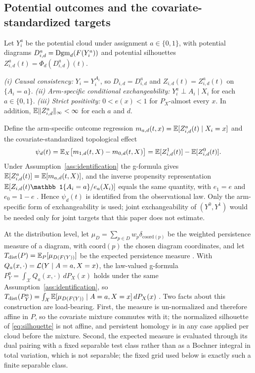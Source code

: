 \subsection{Potential outcomes and the covariate-standardized targets}

Let $Y_i^a$ be the potential cloud under assignment $a \in \{0,1\}$, with potential diagrams
$D_{i,d}^a = \mathrm{Dgm}_d(F(Y_i^a))$ and potential silhouettes $Z_{i,d}^a(t) = \Phi_d(D_{i,d}^a)(t)$.

\begin{assumption}[Identification]
\label{ass:identification}
\emph{(i) Causal consistency:} $Y_i = Y_i^{A_i}$, so
$D_{i,d} = D_{i,d}^a$ and $Z_{i,d}(t) = Z_{i,d}^a(t)$ on $\{A_i=a\}$. \emph{(ii) Arm-specific
conditional exchangeability:} $Y_i^a \perp A_i \mid X_i$ for each $a \in \{0,1\}$. \emph{(iii)
Strict positivity:} $0 < e(x) < 1$ for $P_X$-almost every $x$. In addition,
$\mathbb{E}\lVert Z_{i,d}^a\rVert_\infty < \infty$ for each $a$ and $d$.
\end{assumption}

Define the arm-specific outcome regression $m_{a,d}(t,x) = \mathbb{E}[Z_{i,d}^a(t) \mid X_i = x]$ and the
covariate-standardized topological effect
\begin{equation}
\label{eq:psi}
\psi_d(t) = \mathbb{E}_X\bigl[m_{1,d}(t,X) - m_{0,d}(t,X)\bigr]
= \mathbb{E}[Z_{i,d}^1(t)] - \mathbb{E}[Z_{i,d}^0(t)].
\end{equation}
Under Assumption~\ref{ass:identification} the g-formula gives $\mathbb{E}[Z_{i,d}^a(t)] = \mathbb{E}[m_{a,d}(t,X)]$, and the inverse
propensity representation $\E[Z_{i,d}(t)\mathbb 1\{A_i=a\}/e_a(X_i)]$ equals the same quantity,
with $e_1=e$ and $e_0=1-e$ \cite{souto_diamantis_tcda_2026,kim_lee_tce_2026}. Hence $\psi_d(t)$ is
identified from the observational law. Only the arm-specific form of exchangeability is used;
joint exchangeability of $(Y^0,Y^1)$ would be needed only for joint targets that this paper does
not estimate.

At the distribution level, let $\mu_D = \sum_{p \in D} w_p \delta_{\mathrm{coord}(p)}$ be the
weighted persistence measure of a diagram, with $\mathrm{coord}(p)$ the chosen diagram
coordinates, and let $T_{\mathrm{dist}}(P) = \mathbb{E}_P[\mu_{D(F(Y))}]$ be the expected persistence
measure \cite{divol_chazal_2020,divol_lacombe_2021}. With $Q_a(x,\cdot) = \mathcal{L}(Y \mid A=a, X=x)$,
the law-valued g-formula $P^a_Y = \int_{\mathcal X} Q_a(x,\cdot)\,dP_X(x)$ holds under the same
Assumption~\ref{ass:identification}, so $T_{\mathrm{dist}}(P^a_Y) = \int_{\mathcal X}
\mathbb{E}[\mu_{D(F(Y))} \mid A=a, X=x]\,dP_X(x)$ \cite{souto_diamantis_tcda_2026}. Two facts about this
construction are load-bearing. First, the measure is un-normalized and therefore affine in $P$,
so the covariate mixture commutes with it; the normalized silhouette of \eqref{eq:silhouette} is
not affine, and persistent homology is in any case applied per cloud before the mixture. Second,
the expected measure is evaluated through its dual pairing with a fixed separable test class
rather than as a Bochner integral in total variation, which is not separable; the fixed grid used
below is exactly such a finite separable class.

